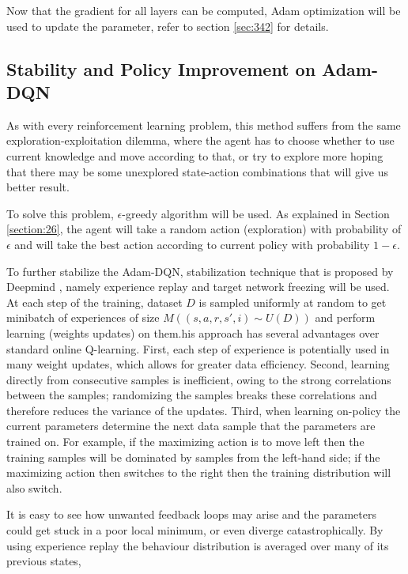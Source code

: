     Now that the gradient for all layers can be computed, Adam optimization will be used to update the parameter, refer to section \ref{sec:342} for details.
    
    
    \subsection{Stability and Policy Improvement on Adam-DQN}
    
    As with every reinforcement learning problem, this method suffers from the same exploration-exploitation dilemma, where the agent has to choose whether to use current knowledge and move according to that, or try to explore more hoping that there may be some unexplored state-action combinations that will give us better result.
    \par
    To solve this problem, $\epsilon$-greedy algorithm will be used. As explained in Section \ref{section:26}, the agent will take a random action (exploration) with probability of $\epsilon$ and will take the best action according to current policy with probability $1 - \epsilon$.
    \par
    To further stabilize the Adam-DQN, stabilization technique that is proposed by Deepmind \cite{mnih2015humanlevel} , namely experience replay and target network freezing will be used.
    At each step of the training, dataset $D$ is sampled uniformly at random to get minibatch of experiences of size $M (( s, a, r, s' , i) \sim U (D))$ and perform learning (weights updates) on them.his approach has several advantages over standard online Q-learning. First, each step of experience
    is potentially used in many weight updates, which allows for greater data efficiency.
    Second, learning directly from consecutive samples is inefficient, owing to the strong
    correlations between the samples; randomizing the samples breaks these correlations and therefore reduces the variance of the updates. Third, when learning on-policy the current parameters determine the next data sample that the parameters are trained on. For example, if the maximizing action is to move left then the training samples will be dominated by samples from the left-hand side; if the maximizing action then switches to the right then the training distribution will also switch.
    \par
    It is easy to see how unwanted feedback loops may arise and the parameters could get
    stuck in a poor local minimum, or even diverge catastrophically. By using experience
    replay the behaviour distribution is averaged over many of its previous states,
